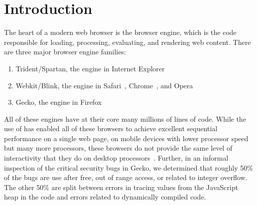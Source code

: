 \section{Introduction}
\label{sec:intro}
The heart of a modern web browser is the browser engine, which is the code responsible
for loading, processing, evaluating, and rendering web content.
There are three major browser engine families:
\begin{enumerate}
\item Trident/Spartan, the engine in Internet Explorer~\cite{IE}
\item Webkit\cite{WEBKIT}/Blink, the engine in Safari~\cite{SAFARI}, Chrome~\cite{CHROME}, and Opera~\cite{OPERA}
\item Gecko, the engine in Firefox~\cite{FIREFOX}
\end{enumerate}
All of these engines have at their core many millions of lines of \Cplusplus{} code.
While the use of \Cplusplus{} has enabled all of these browsers to achieve excellent sequential
performance on a single web page, on mobile devices with lower processor speed but many
more processors, these browsers do not provide the same level of interactivity that they
do on desktop processors~\cite{parallelizing-web-pages,ZOOMM}.
Further, in an informal inspection of the critical security bugs in Gecko, we determined that
roughly 50\% of the bugs are use after free, out of range access, or related to integer
overflow.
The other 50\% are split between errors in tracing values from the JavaScript heap in the
\Cplusplus{} code and errors related to dynamically compiled code.

